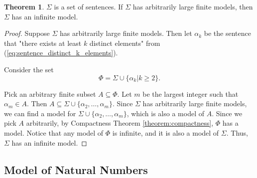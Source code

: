 \documentclass[11pt,letterpaper]{book}
\theoremstyle{definition}
\newtheorem{theorem}{Theorem}[section]
\begin{document}
\begin{theorem}
\label{theorem:infinite}
$\Sigma$ is a set of sentences. If $\Sigma$ has arbitrarily large finite
models, then $\Sigma$ has an infinite model.
\end{theorem}

\begin{proof}
Suppose $\Sigma$ has arbitrarily large finite models. Then let
$\alpha_k$ be the sentence that "there exists at least $k$ distinct
elements" from (\ref{eq:sentence_distinct_k_elements}).

Consider the set
$$\Phi =\Sigma \cup  \{ \alpha_k | k \geq 2 \} . $$

Pick an arbitrary finite subset $A \subseteq \Phi$. Let $m$ be the
largest integer such that $\alpha_m \in A$. Then $A \subseteq \Sigma
\cup \{ \alpha_2, \ldots, \alpha_m   \} $. Since $\Sigma$ has
arbitrarily large finite models, we can find a model for $\Sigma \cup
\{\alpha_2, \ldots, \alpha_m  \}$, which is also a model of $A$. Since
we pick $A$ arbitrarily, by Compactness Theorem
\ref{theorem:compactness}, $\Phi$ has a model. Notice that any model of
$\Phi$ is infinite, and it is also a model of $\Sigma$. Thus, $\Sigma$
has an infinite model.

\end{proof}

\subsection{Model of Natural Numbers}
\end{document}
